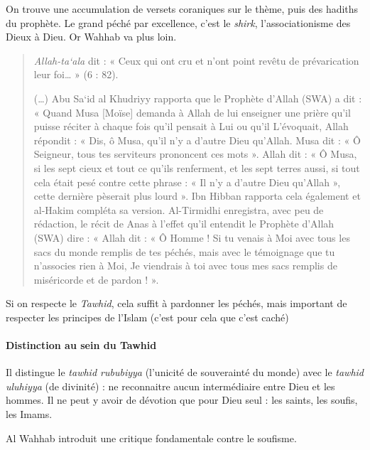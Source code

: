 On trouve une accumulation de versets coraniques sur le thème, puis des hadiths du prophète. Le grand péché par excellence, c'est le \emph{shirk}, l'associationisme des Dieux à Dieu. Or Wahhab va plus loin. 

\begin{quote}


\emph{Allah-ta`ala} dit : « Ceux qui ont cru et n'ont point revêtu de
prévarication leur foi\ldots{} » (6 : 82).

(\ldots) Abu Sa`id al Khudriyy rapporta que le Prophète d'Allah (SWA) a
dit : « Quand Musa {[}Moïse{]} demanda à Allah de lui enseigner une
prière qu'il puisse réciter à chaque fois qu'il pensait à Lui ou qu'il
L'évoquait, Allah répondit : « Dis, ô Musa, qu'il n'y a d'autre Dieu
qu'Allah. Musa dit : « Ô Seigneur, tous tes serviteurs prononcent ces
mots ». Allah dit : « Ô Musa, si les sept cieux et tout ce qu'ils
renferment, et les sept terres aussi, si tout cela était pesé contre
cette phrase : « Il n'y a d'autre Dieu qu'Allah », cette dernière
pèserait plus lourd ». Ibn Hibban rapporta cela également et al-Hakim
compléta sa version. Al-Tirmidhi enregistra, avec peu de rédaction, le
récit de Anas à l'effet qu'il entendit le Prophète d'Allah (SWA) dire :
« Allah dit : « Ô Homme ! Si tu venais à Moi avec tous les sacs du monde
remplis de tes péchés, mais avec le témoignage que tu n'associes rien à
Moi, Je viendrais à toi avec tous mes sacs remplis de miséricorde et de
pardon ! ».

    
\end{quote}

\begin{Synthesis}
Si on respecte le \emph{Tawhid}, cela suffit à pardonner les péchés, mais important de respecter les principes de l'Islam (c'est pour cela que c'est caché)
\end{Synthesis}

\paragraph{Distinction au sein du Tawhid } 
\begin{Def}
Il distingue le \emph{tawhid rububiyya} (l'unicité de souverainté du monde) avec le \emph{tawhid uluhiyya} (de divinité) : ne reconnaitre aucun intermédiaire entre Dieu et les hommes. Il ne peut y avoir de dévotion que pour Dieu seul : les saints, les soufis, les Imams.
\end{Def} 
Al Wahhab introduit une critique fondamentale contre le soufisme. 

